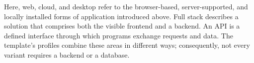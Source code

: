 \begin{beginnerstatement}

Here, web, cloud, and desktop refer to the browser-based, server-supported, and
locally installed forms of application introduced above. Full stack describes a
solution that comprises both the visible frontend and a backend. An API is a
defined interface through which programs exchange requests and data. The
template's profiles combine these areas in different ways; consequently, not
every variant requires a backend or a database.

\end{beginnerstatement}
